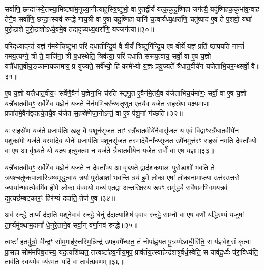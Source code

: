 {\anuvakamend[{अ॒स्मै॒ धा॒व॒ति॒ ता वा एक॑विꣳशतिश्च॥10॥}]}

सर्वा॑णि॒ छन्दाꣳ॑स्ये॒तस्या॒मिष्ट्या॑म॒नूच्या॒नीत्या॑हुस्त्रि॒ष्टुभो॒ वा ए॒तद्वी॒र्यं॑ यत्क॒कुदु॒ष्णिहा॒ जग॑त्यै॒ यदु॑ष्णिहक॒कुभा॑व॒न्वाह॒ तेनै॒व सर्वा॑णि॒ छन्दा॒ꣳ॒स्यव॑ रुन्द्धे गाय॒त्री वा ए॒षा यदु॒ष्णिहा॒ यानि॑ च॒त्वार्यध्य॒क्षरा॑णि॒ चतु॑ष्पाद ए॒व ते प॒शवो॒ यथा॑ पुरो॒डाशे॑ पुरो॒डाशो\-ऽध्ये॒वमे॒व तद्यदृ॒च्यध्य॒क्षरा॑णि॒ यज्जग॑त्या॥३०॥

प॒रि॒द॒ध्यादन्तं॑ य॒ज्ञं ग॑मयेत्त्रि॒ष्टुभा॒ परि॑ दधातीन्द्रि॒यं वै वी॒र्यं॑ त्रि॒ष्टुगि॑न्द्रि॒य ए॒व वी॒र्ये॑ य॒ज्ञं प्रति॑ ष्ठापयति॒ नान्तं॑ गमय॒त्यग्ने॒ त्री ते॒ वाजि॑ना॒ त्री ष॒धस्थेति॒ त्रिव॑त्या॒ परि॑ दधाति सरूप॒त्वाय॒ सर्वो॒ वा ए॒ष य॒ज्ञो यत्त्रै॑धात॒वीय॒ङ्कामा॑यकामाय॒ प्र यु॑ज्यते॒ सर्वे᳚भ्यो॒ हि कामे᳚भ्यो य॒ज्ञः प्र॑यु॒ज्यते᳚ त्रैधात॒वीये॑न यजेताभि॒चर॒न्थ्सर्वो॒ वै॥३१॥

ए॒ष य॒ज्ञो यत्त्रै॑धात॒वीय॒ꣳ॒ सर्वे॑णै॒वैनं॑ य॒ज्ञेना॒भि च॑रति स्तृणु॒त ए॒वैन॑मे॒तयै॒व य॑जेताभिच॒र्यमा॑णः॒ सर्वो॒ वा ए॒ष य॒ज्ञो यत्त्रै॑धात॒वीय॒ꣳ॒ सर्वे॑णै॒व य॒ज्ञेन॑ यजते॒ नैन॑मभि॒चर᳚न्थ्स्तृणुत ए॒तयै॒व य॑जेत स॒हस्रे॑ण य॒क्ष्यमा॑णः॒ प्रजा॑तमे॒वैन॑द्ददात्ये॒तयै॒व य॑जेत स॒हस्रे॑णेजा॒नो\-ऽन्तं॒ वा ए॒ष प॑शू॒नां ग॑च्छति॥३२॥

यः स॒हस्रे॑ण॒ यज॑ते प्र॒जाप॑तिः॒ खलु॒ वै प॒शून॑सृजत॒ ताꣳ स्त्रै॑धात॒वीये॑नै॒वासृ॑जत॒ य ए॒वं वि॒द्वाꣳस्त्रै॑धात॒वीये॑न प॒शुका॑मो॒ यज॑ते॒ यस्मा॑दे॒व योनेः᳚ प्र॒जाप॑तिः प॒शूनसृ॑जत॒ तस्मा॑दे॒वैना᳚न्थ्सृजत॒ उपै॑न॒मुत्त॑रꣳ स॒हस्रं॑ नमति दे॒वता᳚भ्यो॒ वा ए॒ष आ वृ॑श्च्यते॒ यो य॒क्ष्य इत्यु॒क्त्वा न यज॑ते त्रैधात॒वीये॑न यजेत॒ सर्वो॒ वा ए॒ष य॒ज्ञः॥३३॥

यत्त्रै॑धात॒वीय॒ꣳ॒ सर्वे॑णै॒व य॒ज्ञेन॑ यजते॒ न दे॒वता᳚भ्य॒ आ वृ॑श्च्यते॒ द्वाद॑शकपालः पुरो॒डाशो॑ भवति॒ ते त्रय॒श्चतु॑ष्कपालास्त्रिष्षमृद्ध॒त्वाय॒ त्रयः॑ पुरो॒डाशा॑ भवन्ति॒ त्रय॑ इ॒मे लो॒का ए॒षां लो॒काना॒माप्त्या॒ उत्त॑रउत्तरो॒ ज्याया᳚न्भवत्ये॒वमि॑व॒ हीमे लो॒का य॑व॒मयो॒ मध्य॑ ए॒तद्वा अ॒न्तरि॑क्षस्य रू॒पꣳ समृ॑द्ध्यै॒ सर्वे॑षामभिग॒मय॒न्नव॑ द्य॒त्यछ॑म्बट्कार॒ꣳ॒ हिर॑ण्यं ददाति॒ तेज॑ ए॒व॥३४॥

अव॑ रुन्द्धे ता॒र्प्यं द॑दाति प॒शूने॒वाव॑ रुन्द्धे धे॒नुं द॑दात्या॒शिष॑ ए॒वाव॑ रुन्द्धे॒ साम्नो॒ वा ए॒ष वर्णो॒ यद्धिर॑ण्यं॒ यजु॑षां ता॒र्प्यमु॑क्थाम॒दानां᳚ धे॒नुरे॒ताने॒व सर्वा॒न् वर्णा॒नव॑ रुन्द्धे॥३५॥

{\anuvakamend[{जग॑त्या\-ऽभि॒चर॒न्थ्सर्वो॒ वै ग॑च्छति य॒ज्ञस्तेज॑ ए॒व त्रि॒ꣳ॒शच्च॑॥11॥}]}

त्वष्टा॑ ह॒तपु॑त्रो॒ वीन्द्र॒ꣳ॒ सोम॒माह॑र॒त्तस्मि॒न्निन्द्र॑ उपह॒वमै᳚च्छत॒ तं नोपा᳚ह्वयत पु॒त्रम्मे॑\-ऽवधी॒रिति॒ स य॑ज्ञवेश॒सं कृ॒त्वा प्रा॒सहा॒ सोम॑मपिब॒त्तस्य॒ यद॒त्यशि॑ष्यत॒ तत्त्वष्टा॑हव॒नीय॒मुप॒ प्राव॑र्तय॒त्स्वाहेन्द्र॑शत्रुर्वर्ध॒स्वेति॒ स याव॑दू॒र्ध्वः प॑रा॒विध्य॑ति॒ ताव॑ति स्व॒यमे॒व व्य॑रमत॒ यदि॑ वा॒ ताव॑त्प्रव॒णम्॥३६॥

